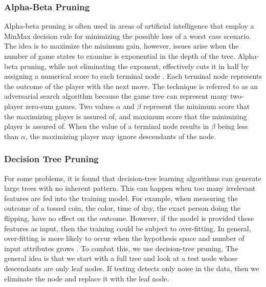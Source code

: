 	\subsubsection{Alpha-Beta Pruning}
		Alpha-beta pruning is often used in areas of artificial intelligence that employ a MinMax decision rule for minimizing the possible loss of a worst case scenario. 
		The idea is to maximize the minimum gain, however, issues arise when the number of game states to examine is exponential in the depth of the tree. 
		Alpha-beta pruning, while not eliminating the exponent, effectively cuts it in half by assigning a numerical score to each terminal node \cite{russell2010artificial}. 
		Each terminal node represents the outcome of the player with the next move.
		The technique is referred to as an adversarial search algorithm because the game tree can represent many two-player zero-sum games. 
		Two values $\alpha$ and $\beta$ represent the minimum score that the maximizing player is assured of, and maximum score that the minimizing player is assured of. 
		When the value of a terminal node results in $\beta$ being less than $\alpha$, the maximizing player may ignore descendants of the node.  
	\subsubsection{Decision Tree Pruning}
		For some problems, it is found that decision-tree learning algorithms can generate large trees with no inherent pattern. This can happen when too many irrelevant features are fed into the training model. 
		For example, when measuring the outcome of a tossed coin, the color, time of day, the exact person doing the flipping, have no effect on the outcome. 
		However, if the model is provided these features as input, then the training could be subject to over-fitting. 
		In general, over-fitting is more likely to occur when the hypothesis space and number of input attributes grows \cite{russell2010artificial}. 
		To combat this, we use decision-tree pruning. 
		The general idea is that we start with a full tree and look at a test node whose descendants are only leaf nodes. 
		If testing detects only noise in the data, then we eliminate the node and replace it with the leaf node.
	